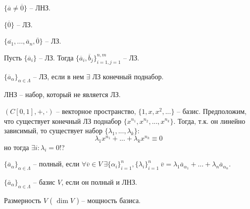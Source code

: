 	\begin{Example}
		$\{\overline{a} \neq \overline{0}\}$ -- ЛНЗ.
	\end{Example}

	\begin{Example}
		$\{\overline{0}\}$ -- ЛЗ.
	\end{Example}

	\begin{Example}
		$\{\overline{a_1}, ..., \overline{a}_n, \overline{0}\}$ -- ЛЗ.
	\end{Example}

	\begin{Example}
		Пусть $\{\overline{a}_i\}$ -- ЛЗ. Тогда $\{\overline{a}_i, \overline{b}_j\}_{i = 1, j = 1}^{n, m}$ -- ЛЗ.
	\end{Example}

	\begin{Def}
		$\{\overline{a}_\alpha\}_{\alpha \in \Lambda}$ -- ЛЗ, если в нем $\exists$ ЛЗ конечный поднабор.
	\end{Def}

	\begin{Def}
		ЛНЗ -- набор, который не является ЛЗ.
	\end{Def}

	\begin{Example}
		$(C[0, 1], +, \cdot)$ -- векторное пространство, $\{1, x, x^2, ...\}$ -- базис.
		Предположим, что существует конечный ЛЗ поднабор $\{x^{n_1}, x^{n_2}, ..., x^{n_k}\}$.
		Тогда, т.к. он линейно зависимый, то существует набор $\{\lambda_1, ..., \lambda_k\}$:
		\[\lambda_1 x^{n_1} + ... + \lambda_k x^{n_k} \equiv 0\]
		но тогда $\exists i : \lambda_i = 0$!?
	\end{Example}

	\begin{Def}
		$\{\overline{a}_\alpha\}_{\alpha \in \Lambda}$ -- полный, если $\forall \overline{v} \in V \ \exists \{\alpha_i\}_{i = 1}^n, \{\lambda_i\}_{i = 1}^n \ \overline{v} = \lambda_1 \overline{a}_{\alpha_1} + ... + \lambda_n \overline{a}_{\alpha_n}$.
	\end{Def}

	\begin{Def}
		$\{\overline{a}_\alpha\}_{\alpha \in \Lambda}$ -- базис $V$, если он полный и ЛНЗ.
	\end{Def}

	\begin{Def}
		Размерность $V$ ( $\dim V$ ) -- мощность базиса.
	\end{Def}

